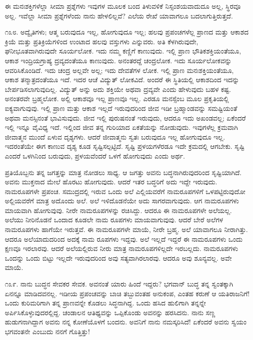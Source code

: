 ಈ ಮನಃಶಕ್ತಿಗಳೆಲ್ಲಾ ಸೀಮಾ ಪ್ರಶ್ನೆಗಳು  ಇವುಗಳ ಮೂಲಕ ಬಂದ ತಿಳುವಳಿಕೆ ನಿಸ್ಸಂಶಯವಾದುದೂ ಅಲ್ಲ, ಸ್ಥಿರವೂ ಅಲ್ಲ. ಇವೆಲ್ಲಾ ಸೀಮಾ ಪ್ರಶ್ನೆಗಳೆಂದು ನಾನು ಹೇಳಲಿಲ್ಲವೆ? ಎಲೆಯ ರೇಖೆ ಯಾವಾಗಲೂ ಬದಲಾಗುತ್ತಿರುತ್ತದೆ.

೧೩೮. ಅದ್ವೈತಿಗಳು; ಆತ್ಮ ಬರುವುದೂ ಇಲ್ಲ, ಹೋಗುವುದೂ ಇಲ್ಲ; ಹಲವು ಪ್ರಪಂಚಗಳೆಲ್ಲ ಪ್ರಾಣದ ಮತ್ತು ಆಕಾಶದ ಕ್ರಿಯೆ ಮತ್ತು ಪ್ರತಿಕ್ರಿಯೆಗಳಿಂದ ಉಂಟಾದ ಹಲವು ವಸ್ತುಗಳು ಎನ್ನುವರು. ಅತಿ ಕೆಳಗಿರುವುದೇ, ಘನೀಭೂತವಾಗಿರುವುದೇ ಸೂರ್ಯಲೋಕ. ಇದು ನಮ್ಮ ಕಣ್ಣಿಗೆ ಕಾಣುವುದು. ಇಲ್ಲಿ ಪ್ರಾಣ ಭೌತಿಕಶಕ್ತಿಯಂತೆಯೂ, ಆಕಾಶ ಇಂದ್ರಿಯಗ್ರಾಹ್ಯ ದ್ರವ್ಯದಂತೆಯೂ ಕಾಣುವುದು. ಅನಂತರದ್ದೆ ಚಂದ್ರಲೋಕ. ಇದು ಸೂರ್ಯಲೋಕವನ್ನು ಆವರಿಸಿಕೊಂಡಿದೆ. ಇದು ಚಂದ್ರ ಅಲ್ಲವೇ ಅಲ್ಲ; ಇದು ದೇವತೆಗಳ ಲೋಕ. ಇಲ್ಲಿ ಪ್ರಾಣ ಮನಃಶಕ್ತಿಯಂತೆಯೂ, ಆಕಾಶ ತನ್ಮಾತ್ರದಂತೆಯೂ ಇದೆ. ಇದರ ಆಚೆ ವಿದ್ಯುತ್‌ ಲೋಕವಿದೆ. ಅಂದರೆ ಈ ಸ್ಥಿತಿಯಲ್ಲಿ ಆಕಾಶದಿಂದ ಇದನ್ನು ಬೇರ್ಪಡಿಸಲಾಗುವುದಿಲ್ಲ. ವಿದ್ಯುತ್ ಅನ್ನು ಅದು ಶಕ್ತಿಯೇ ಅಥವಾ ದ್ರವ್ಯವೇ ಎಂದು ಹೇಳುವುದು ಬಹಳ ಕಷ್ಟ. ಅನಂತರವೇ ಬ್ರಹ್ಮಲೋಕ. ಅಲ್ಲಿ ಆಕಾಶವೂ ಇಲ್ಲ ಪ್ರಾಣವೂ ಇಲ್ಲ. ಎರಡೂ ಮನಸ್ಸೆಂಬ ಮೂಲ ಪ್ರಕೃತಿಯಲ್ಲಿ ಐಕ್ಯವಾಗುವುವು. ಇಲ್ಲಿ ಪ್ರಾಣ ಮತ್ತು ಆಕಾಶ ಇಲ್ಲದೆ ಇರುವುದರಿಂದ ಜೀವ ಇಡೀ ಬ್ರಹ್ಮಾಂಡವನ್ನು ಸಮಷ್ಟಿಯಂತೆ ಅಥವಾ ಮನಸ್ಸಿನಂತೆ ಭಾವಿಸುವುದು. ಜೀವ ಇಲ್ಲಿ ಪುರುಷನಂತೆ ಇರುವುದು, ಆದರೂ ಇದು ಅಖಂಡವಲ್ಲ; ಏಕೆಂದರೆ ಇಲ್ಲಿ ಇನ್ನೂ ವೈವಿಧ್ಯ ಇದೆ. ಇಲ್ಲಿಂದ ಜೀವ ತನ್ನ ಗುರಿಯಾದ ಏಕತೆಯನ್ನು ನೋಡುವುದು. ಇವುಗಳೆಲ್ಲ ಕ್ರಮವಾಗಿ ಜೀವಾತ್ಮನ ಮುಂದೆ ಏಳುವ ದೃಶ್ಯಗಳು. ಆದರೆ ಜೀವಾತ್ಮನು ಸ್ವತಃ ಬರುವುದೂ ಇಲ್ಲ ಹೋಗುವುದೂ ಇಲ್ಲ. ಇದರಂತೆಯೇ ಈಗ ಕಾಣುವ ದೃಶ್ಯ ಕೂಡ ಸೃಷ್ಟಿಸಲ್ಪಟ್ಟಿದೆ. ಸೃಷ್ಟಿ ಪ್ರಳಯಗಳೆರಡೂ ಇದೇ ಕ್ರಮದಲ್ಲಿ ಆಗಬೇಕು. ಸೃಷ್ಟಿ ಎಂದರೆ ಒಳಗಿನಿಂದ ಬರುವುದು, ಪ್ರಳಯವೆಂದರೆ ಒಳಗೆ ಹೋಗುವುದು ಎಂದು ಅರ್ಥ.

ಪ್ರತಿಯೊಬ್ಬನು ತನ್ನ ಜಗತ್ತನ್ನು ಮಾತ್ರ ನೋಡಲು ಸಾಧ್ಯ. ಆ ಜಗತ್ತು ಅವನು ಬದ್ಧನಾಗಿರುವುದರಿಂದ ಸೃಷ್ಟಿಯಾಗಿದೆ. ಅವನು ಮುಕ್ತನಾದ ಮೇಲೆ ಹೊರಟು ಹೋಗುವುದು. ಆದರೆ ಇತರ ಬದ್ಧರಿಗೆ ಅದು ಇದ್ದೇ ಇರುವುದು. ನಾಮರೂಪಗಳೇ ಪ್ರಪಂಚ. ಸಮುದ್ರದಲ್ಲಿ ಇರುವ ಒಂದು ಅಲೆ ಎಲ್ಲಿಯವರೆಗೆ ನಾಮರೂಪಗಳಿಗೆ ಒಳಪಟ್ಟಿರುವುದೋ ಅಲ್ಲಿಯವರೆಗೆ ಮಾತ್ರ ಅದೊಂದು ಅಲೆ. ಅಲೆ ಇಳಿದೊಡನೆಯೇ ಅದು ಸಾಗರವಾಗುವುದು. ಆಗ ನಾಮರೂಪಗಳು ಮಾಯವಾಗಿ ಹೋಗುವುವು. ನೀರೇ ನಾಮರೂಪಗಳನ್ನು ರಚಿಸಿದ್ದು. ಆದರೂ ಈ ನಾಮರೂಪಗಳೇ ಅಲೆಯಲ್ಲ. ಅಲೆಯು ನೀರಿನೊಡನೆ ಒಂದಾದ ಕೂಡಲೇ ನಾಮ ರೂಪಗಳು ಮಾಯವಾಗುವುವು. ಆದರೆ ಬೇರೆ ಅಲೆಗಳ ನಾಮರೂಪಗಳು ಹಾಗೆಯೇ ಇರುತ್ತವೆ. ಈ ನಾಮರೂಪಗಳೇ ಮಾಯೆ, ನೀರೇ ಬ್ರಹ್ಮ. ಅಲೆ ಯಾವಾಗಲೂ ನೀರಾಗಿತ್ತು. ಆದರೂ ಅಲೆಯಾದುದರಿಂದ ಅದಕ್ಕೆ ನಾಮ ರೂಪಗಳು ಇದ್ದವು. ಅಲೆ ಇಲ್ಲದೆ ಇದ್ದರೆ ಈ ನಾಮರೂಪಗಳು ಒಂದು ಕ್ಷಣವೂ ಇರಲಾರವು. ಆದರೆ ಅಲೆಯಲ್ಲಿರುವ ನೀರು ಮಾತ್ರ ನಾಮರೂಪಗಳಿಲ್ಲದೇ ಇರಬಲ್ಲದು. ನಾಮರೂಪಗಳು ಒಂದನ್ನು ಒಂದು ಬಿಟ್ಟು ಇಲ್ಲದೇ ಇರುವುದರಿಂದ ಅವು ಸತ್ಯವಾಗಿರಲಾರವು. ಆದರೂ ಅವು ಶೂನ್ಯವಲ್ಲ. ಅವೇ ಮಾಯೆ.

೧೩೯. ನಾನು ಬುದ್ಧನ ಸೇವಕರ ಸೇವಕ. ಅವನಂತೆ ಯಾರು ಹಿಂದೆ ಇದ್ದರು? ಭಗವಾನ್ ಬುದ್ಧ ತನ್ನ ಸ್ವಂತಕ್ಕಾಗಿ ಏನನ್ನೂ ಮಾಡಿದವನಲ್ಲ. ಇಡೀಯ ಪ್ರಪಂಚವನ್ನು ಬಾಚಿ ತಬ್ಬುವಂತಹ ಅನುಕಂಪ, ಎಂತಹ ಕರುಣೆ ಆ ಯತಿರಾಜನಿಗೆ! ಒಂದು ಕುರಿಮರಿಗಾಗಿ ತನ್ನ ಪ್ರಾಣವನ್ನೇ ಕೊಡಲು ಸಿದ್ಧನಾಗಿದ್ದ. ಒಂದು ಹಸಿದ ಹುಲಿಗಾಗಿ ತನ್ನನ್ನೇ ಅರ್ಪಿಸಿಕೊಳ್ಳುವುದರಲ್ಲಿದ್ದ. ಚಂಡಾಲನ ಆತಿಥ್ಯವನ್ನು ಒಪ್ಪಿಕೊಂಡು ಅವನನ್ನು ಹರಸಿದನು. ನಾನು ಸಣ್ಣ ಹುಡುಗನಾಗಿದ್ದಾಗ ಅವನು ನನ್ನ ಕೋಣೆಯೊಳಗೆ ಬಂದನು. ಅವನಿಗೆ ನಾನು ನಮಸ್ಕರಿಸಿದೆ! ಏಕೆಂದರೆ ಅವನು ಸ್ವಯಂ ಭಗವಂತನೇ ಎಂಬುದು ನನಗೆ ಗೊತ್ತಿತ್ತು!

